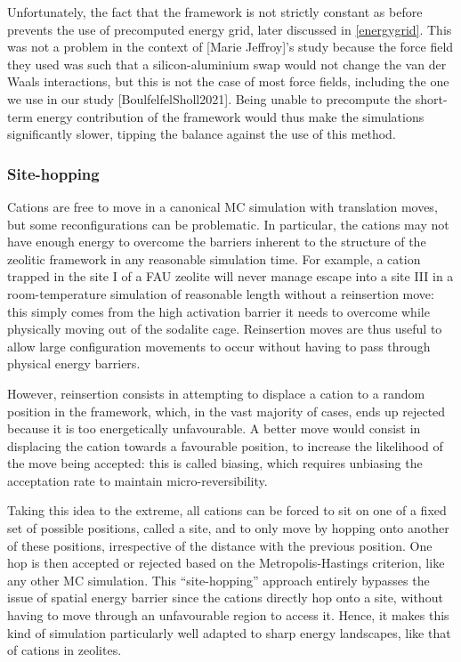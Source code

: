\documentclass[main.tex]{subfiles}
\begin{document}
Unfortunately, the fact that the framework is not strictly constant as before prevents the use of precomputed energy grid, later discussed in \cref{energygrid}. This was not a problem in the context of [Marie Jeffroy]'s study because the force field they used was such that a silicon-aluminium swap would not change the van der Waals interactions, but this is not the case of most force fields, including the one we use in our study [BoulfelfelSholl2021]. Being unable to precompute the short-term energy contribution of the framework would thus make the simulations significantly slower, tipping the balance against the use of this method.

\subsubsection{Site-hopping}

\label{sitehopping}

Cations are free to move in a canonical MC simulation with translation moves, but some reconfigurations can be problematic. In particular, the cations may not have enough energy to overcome the barriers inherent to the structure of the zeolitic framework in any reasonable simulation time. For example, a cation trapped in the site I of a FAU zeolite will never manage escape into a site III in a room-temperature simulation of reasonable length without a reinsertion move: this simply comes from the high activation barrier it needs to overcome while physically moving out of the sodalite cage. Reinsertion moves are thus useful to allow large configuration movements to occur without having to pass through physical energy barriers.

However, reinsertion consists in attempting to displace a cation to a random position in the framework, which, in the vast majority of cases, ends up rejected because it is too energetically unfavourable. A better move would consist in displacing the cation towards a favourable position, to increase the likelihood of the move being accepted: this is called biasing, which requires unbiasing the acceptation rate to maintain micro-reversibility.

Taking this idea to the extreme, all cations can be forced to sit on one of a fixed set of possible positions, called a site, and to only move by hopping onto another of these positions, irrespective of the distance with the previous position. One hop is then accepted or rejected based on the Metropolis-Hastings criterion, like any other MC simulation. This ``site-hopping'' approach entirely bypasses the issue of spatial energy barrier since the cations directly hop onto a site, without having to move through an unfavourable region to access it. Hence, it makes this kind of simulation particularly well adapted to sharp energy landscapes, like that of cations in zeolites.
\end{document}
